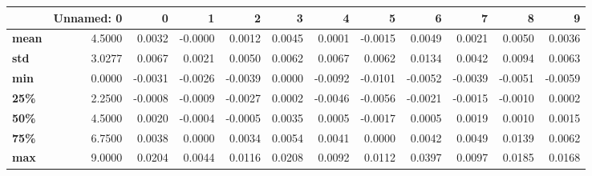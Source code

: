 \begin{tabular}{lrrrrrrrrrrr}
\toprule
{} &  Unnamed: 0 &       0 &       1 &       2 &       3 &       4 &       5 &       6 &       7 &       8 &       9 \\
\midrule
\textbf{mean} &      4.5000 &  0.0032 & -0.0000 &  0.0012 &  0.0045 &  0.0001 & -0.0015 &  0.0049 &  0.0021 &  0.0050 &  0.0036 \\
\textbf{std } &      3.0277 &  0.0067 &  0.0021 &  0.0050 &  0.0062 &  0.0067 &  0.0062 &  0.0134 &  0.0042 &  0.0094 &  0.0063 \\
\textbf{min } &      0.0000 & -0.0031 & -0.0026 & -0.0039 &  0.0000 & -0.0092 & -0.0101 & -0.0052 & -0.0039 & -0.0051 & -0.0059 \\
\textbf{25\% } &      2.2500 & -0.0008 & -0.0009 & -0.0027 &  0.0002 & -0.0046 & -0.0056 & -0.0021 & -0.0015 & -0.0010 &  0.0002 \\
\textbf{50\% } &      4.5000 &  0.0020 & -0.0004 & -0.0005 &  0.0035 &  0.0005 & -0.0017 &  0.0005 &  0.0019 &  0.0010 &  0.0015 \\
\textbf{75\% } &      6.7500 &  0.0038 &  0.0000 &  0.0034 &  0.0054 &  0.0041 &  0.0000 &  0.0042 &  0.0049 &  0.0139 &  0.0062 \\
\textbf{max } &      9.0000 &  0.0204 &  0.0044 &  0.0116 &  0.0208 &  0.0092 &  0.0112 &  0.0397 &  0.0097 &  0.0185 &  0.0168 \\
\bottomrule
\end{tabular}
